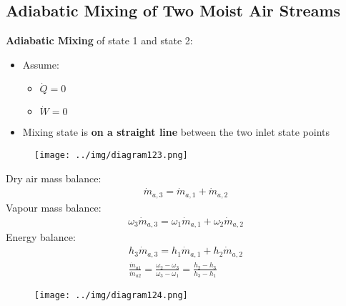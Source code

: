\documentclass[class=report, crop=false, 12pt,a4paper]{standalone}
\numberwithin{equation}{section}
\begin{document}
\subsection{Adiabatic Mixing of Two Moist Air Streams}
\textbf{Adiabatic Mixing} of state 1 and state 2:
\begin{itemize}[noitemsep]
  \item Assume:
  \begin{itemize}[noitemsep]
    \item $\dot{Q} = 0$
    \item $\dot{W} = 0$
  \end{itemize}
  \item Mixing state is \textbf{on a straight line} between the two inlet state points
\end{itemize}
\begin{figure}[H]
  \centering
  \texttt{[image: ../img/diagram123.png]}
  \caption{}
\end{figure}
Dry air mass balance:
\begin{gather}
  \dot{m}_{a,3} = \dot{m}_{a,1} + \dot{m}_{a,2}
\end{gather}
Vapour mass balance:
\begin{gather}
  \omega_3\dot{m}_{a,3} = \omega_1\dot{m}_{a,1} + \omega_2\dot{m}_{a,2}
\end{gather}
Energy balance:
\begin{gather}
  h_3\dot{m}_{a,3} = h_1\dot{m}_{a,1} + h_2\dot{m}_{a,2} \\[5pt]
  \frac{\dot{m}_{a1}}{\dot{m}_{a2}} = \frac{\omega_2-\omega_3}{\omega_3-\omega_1} = \frac{h_2-h_3}{h_3-h_1}
\end{gather}
\begin{figure}[H]
  \centering
  \texttt{[image: ../img/diagram124.png]}
  \caption{}
\end{figure}
\end{document}
